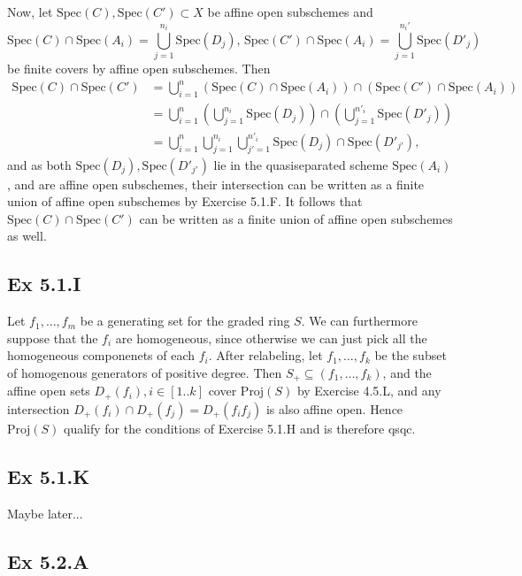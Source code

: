\documentclass{article}
\theoremstyle{definition}
\newcommand{\Spec}{\text{Spec}}
\newcommand{\Proj}{\text{Proj}}
\begin{document}
Now, let $\Spec(C), \Spec(C') \subset X$ be affine open subschemes and 
\[
	\Spec(C) \cap \Spec(A_i) = \bigcup_{j = 1}^{n_i} \Spec(D_j), \,
	\Spec(C') \cap \Spec(A_i) = \bigcup_{j = 1}^{n_i'} \Spec(D'_j)
\] 
be finite covers by affine open subschemes. Then
\begin{align*}
	\Spec(C) \cap \Spec(C')
	&=
	\bigcup_{i = 1}^{n}
	\left(\Spec(C) \cap \Spec(A_i)\right)
	\cap
	\left(\Spec(C') \cap \Spec(A_i)\right) \\
	&=
	\bigcup_{i = 1}^{n}
	\left(
		\bigcup_{j = 1}^{n_i} \Spec(D_j)
	\right)
	\cap
	\left(
		\bigcup_{j = 1}^{n'_i} \Spec(D'_j)
	\right) \\
	&=
	\bigcup_{i = 1}^{n}
	\bigcup_{j = 1}^{n_i} 
	\bigcup_{j' = 1}^{n'_i} 
	\Spec(D_j)
	\cap
	\Spec(D'_{j'}),
\end{align*} 
and as both $\Spec(D_j), \Spec(D'_{j'})$ lie in the quasiseparated scheme
$\Spec(A_i)$, and are affine open subschemes, their intersection can be written
as a finite union of affine open subschemes by Exercise 5.1.F. It follows that
$\Spec(C) \cap \Spec(C')$ can be written as a finite union of affine open
subschemes as well.


\subsection*{Ex 5.1.I}

Let $f_1, \ldots, f_m$ be a generating set for the graded ring $S$. We can
furthermore suppose that the $f_i$ are homogeneous, since otherwise we can just
pick all the homogeneous componenets of each $f_i$. After relabeling, let $f_1,
\ldots, f_k$ be the subset of homogenous generators of positive degree. Then
$S_{+} \subseteq (f_1, \ldots, f_k)$, and the affine open sets $D_{+}(f_i), i
\in [1..k]$ cover $\Proj(S)$ by Exercise 4.5.L, and any intersection
$D_{+}(f_i) \cap D_{+}(f_j) = D_{+}(f_i f_j)$ is also affine open. Hence
$\Proj(S)$ qualify for the conditions of Exercise 5.1.H and is therefore qsqc.

\subsection*{Ex 5.1.K}

Maybe later...

\subsection*{Ex 5.2.A}
\end{document}

